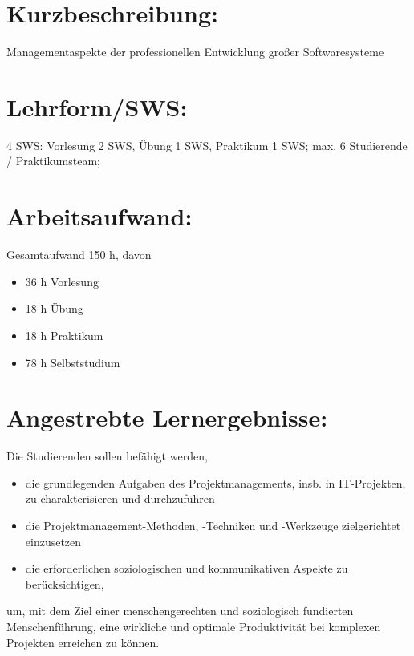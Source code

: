 \section*{Kurzbeschreibung:}\label{kurzbeschreibung-2}

Managementaspekte der professionellen Entwicklung großer Softwaresysteme

\section*{Lehrform/SWS:}\label{lehrformsws-20}

4 SWS: Vorlesung 2 SWS, Übung 1 SWS, Praktikum 1 SWS; max. 6 Studierende
/ Praktikumsteam;

\section*{Arbeitsaufwand:}\label{arbeitsaufwand-19}

Gesamtaufwand 150 h, davon

\begin{itemize}
\item
  36 h Vorlesung
\item
  18 h Übung
\item
  18 h Praktikum
\item
  78 h Selbststudium
\end{itemize}

\section*{Angestrebte
Lernergebnisse:}\label{angestrebte-lernergebnisse-20}

Die Studierenden sollen befähigt werden,

\begin{itemize}
\item
  die grundlegenden Aufgaben des Projektmanagements, insb. in
  IT-Projekten, zu charakterisieren und durchzuführen
\item
  die Projektmanagement-Methoden, -Techniken und -Werkzeuge
  zielgerichtet einzusetzen
\item
  die erforderlichen soziologischen und kommunikativen Aspekte zu
  berücksichtigen,
\end{itemize}

um, mit dem Ziel einer menschengerechten und soziologisch fundierten
Menschenführung, eine wirkliche und optimale Produktivität bei komplexen
Projekten erreichen zu können.

